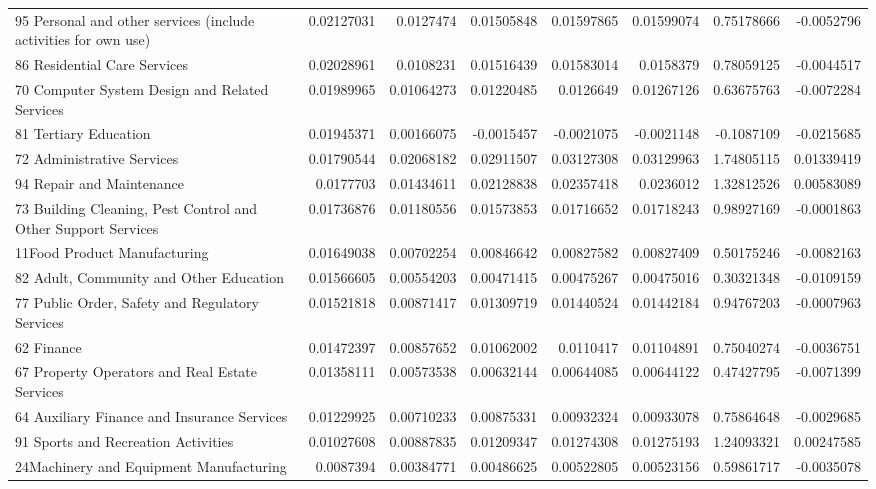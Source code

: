 \documentclass{monashthesis}
\begin{document}
\begin{table}[ht]
{\begin{tabular}{|l|r|rrrr|rr|}
    95 Personal and other services (include activities for own use) & 0.02127031 & 0.0127474 & 0.01505848 & 0.01597865 & 0.01599074 & 0.75178666 & -0.0052796 \\
    86 Residential Care Services & 0.02028961 & 0.0108231 & 0.01516439 & 0.01583014 & 0.0158379 & 0.78059125 & -0.0044517 \\
    70 Computer System Design and Related Services & 0.01989965 & 0.01064273 & 0.01220485 & 0.0126649 & 0.01267126 & 0.63675763 & -0.0072284 \\
    81 Tertiary Education & 0.01945371 & 0.00166075 & -0.0015457 & -0.0021075 & -0.0021148 & -0.1087109 & -0.0215685 \\
    72 Administrative Services & 0.01790544 & 0.02068182 & 0.02911507 & 0.03127308 & 0.03129963 & 1.74805115 & 0.01339419 \\
    94 Repair and Maintenance & 0.0177703 & 0.01434611 & 0.02128838 & 0.02357418 & 0.0236012 & 1.32812526 & 0.00583089 \\
    73 Building Cleaning, Pest Control and Other Support Services & 0.01736876 & 0.01180556 & 0.01573853 & 0.01716652 & 0.01718243 & 0.98927169 & -0.0001863 \\
    11Food Product Manufacturing & 0.01649038 & 0.00702254 & 0.00846642 & 0.00827582 & 0.00827409 & 0.50175246 & -0.0082163 \\
    82 Adult, Community and Other Education & 0.01566605 & 0.00554203 & 0.00471415 & 0.00475267 & 0.00475016 & 0.30321348 & -0.0109159 \\
    77 Public Order, Safety and Regulatory Services & 0.01521818 & 0.00871417 & 0.01309719 & 0.01440524 & 0.01442184 & 0.94767203 & -0.0007963 \\
    62 Finance & 0.01472397 & 0.00857652 & 0.01062002 & 0.0110417 & 0.01104891 & 0.75040274 & -0.0036751 \\
    67 Property Operators and Real Estate Services & 0.01358111 & 0.00573538 & 0.00632144 & 0.00644085 & 0.00644122 & 0.47427795 & -0.0071399 \\
    64 Auxiliary Finance and Insurance Services & 0.01229925 & 0.00710233 & 0.00875331 & 0.00932324 & 0.00933078 & 0.75864648 & -0.0029685 \\
    91 Sports and Recreation Activities & 0.01027608 & 0.00887835 & 0.01209347 & 0.01274308 & 0.01275193 & 1.24093321 & 0.00247585 \\
    24Machinery and Equipment Manufacturing & 0.0087394 & 0.00384771 & 0.00486625 & 0.00522805 & 0.00523156 & 0.59861717 & -0.0035078 \\

\end{tabular}}
\end{table}
\end{document}
